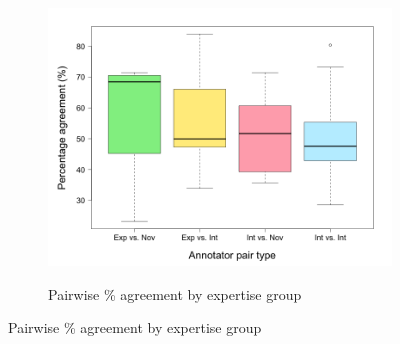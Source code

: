 		\begin{figure}[p]
			\centering
			
			
			\begin{subfigure}{\textwidth}
				\centering
				\caption{Pairwise \% agreement by expertise group}
				\includegraphics[width=\textwidth]{img/plots/pairwisePctByExpertise-noTitle}
				\label{fig:agreement:expertise:pct}
			\end{subfigure}%
			
			\vspace{1em}			
			

\end{figure}
